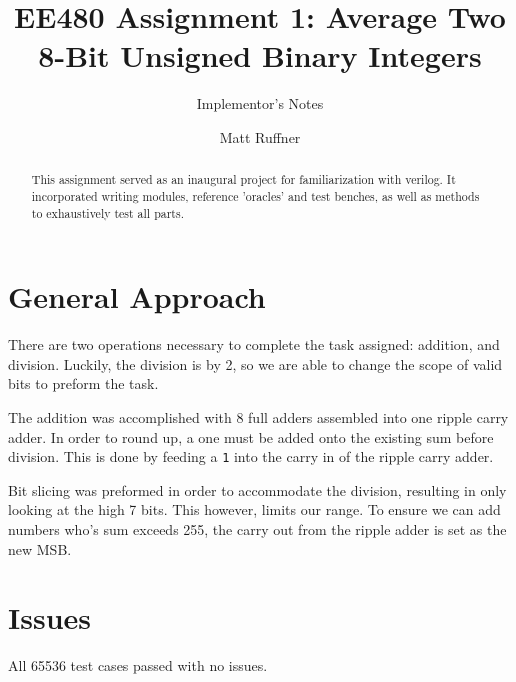 \documentclass{sig-alternate-05-2015}
\begin{document}

\title{EE480 Assignment 1: Average Two 8-Bit Unsigned Binary Integers}
\subtitle{Implementor's Notes}

\author{
Matt Ruffner\\
}

\maketitle
\begin{abstract}
This assignment served as an inaugural project for familiarization with verilog. It incorporated writing modules, reference 'oracles' and test benches, as well as methods to exhaustively test all parts.
\end{abstract}


\section{General Approach}
There are two operations necessary to complete the task assigned: addition, and division. Luckily, the division is by 2, so we are able to change the scope of valid bits to preform the task. 

The addition was accomplished with 8 full adders assembled into one ripple carry adder. In order to round up, a one must be added onto the existing sum before division. This is done by feeding a \texttt{1} into the carry in of the ripple carry adder.

Bit slicing was preformed in order to accommodate the division, resulting in only looking at the high 7 bits. This however, limits our range. To ensure we can add numbers who's sum exceeds 255, the carry out from the ripple adder is set as the new MSB.

\vfill\pagebreak

\section{Issues}
All 65536 test cases passed with no issues.
\end{document}
